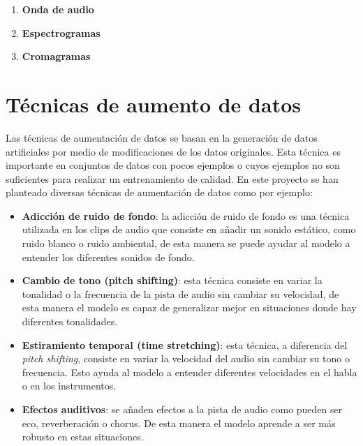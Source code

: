 \begin{enumerate}
\tightlist
\item \textbf{Onda de audio}

\item \textbf{Espectrogramas}

\item \textbf{Cromagramas}
\end{enumerate}

\newpage

\section{Técnicas de aumento de datos}

Las técnicas de aumentación de datos se basan en la generación de datos artificiales por medio de modificaciones de los datos originales. Esta técnica es importante en conjuntos de datos con pocos ejemplos o cuyos ejemplos no son suficientes para realizar un entrenamiento de calidad.
En este proyecto se han planteado diversas técnicas de aumentación de datos como por ejemplo:

\begin{itemize}
\tightlist

\item \textbf{Adicción de ruido de fondo}: la adicción de ruido de fondo es una técnica utilizada en los clips de audio que consiste en añadir un sonido estático, como ruido blanco o ruido ambiental, de esta manera se puede ayudar al modelo a entender los diferentes sonidos de fondo.

\item \textbf{Cambio de tono (pitch shifting)}: esta técnica consiste en variar la tonalidad o la frecuencia de la pista de audio sin cambiar su velocidad, de esta manera el modelo es capaz de generalizar mejor en situaciones donde hay diferentes tonalidades.

\item \textbf{Estiramiento temporal (time stretching)}: esta técnica, a diferencia del \textit{pitch shifting}, consiste en variar la velocidad del audio sin cambiar su tono o frecuencia. Esto ayuda al modelo a entender diferentes velocidades en el habla o en los instrumentos.

\item \textbf{Efectos auditivos}: se añaden efectos a la pista de audio como pueden ser eco, reverberación o chorus. De esta manera el modelo aprende a ser más robusto en estas situaciones.

\end{itemize}

